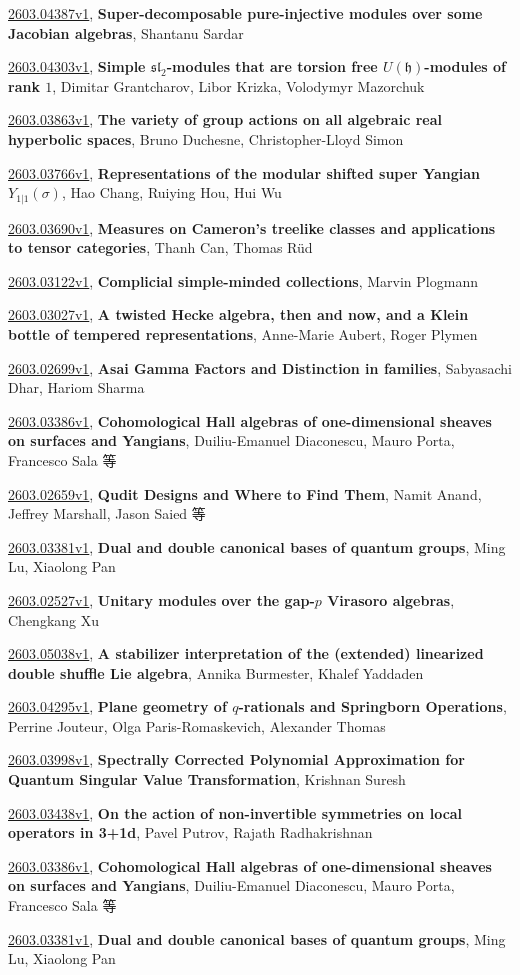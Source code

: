 \documentclass[9pt, a4paper]{article}
\theoremstyle{plain}
\theoremstyle{definition}
\theoremstyle{remark}
\newcommand{\arxiv}[3]{\href{https://arxiv.org/abs/#1}{#1}, \textbf{\textcolor{arxivblue}{#2}}, #3}
\begin{document}
\arxiv{2603.04387v1}{Super-decomposable pure-injective modules over some Jacobian algebras}{Shantanu Sardar}

\arxiv{2603.04303v1}{Simple $\mathfrak{sl}_2$-modules that are torsion free $U(\mathfrak{h})$-modules of rank $1$}{Dimitar Grantcharov, Libor Krizka, Volodymyr Mazorchuk}

\arxiv{2603.03863v1}{The variety of group actions on all algebraic real hyperbolic spaces}{Bruno Duchesne, Christopher-Lloyd Simon}

\arxiv{2603.03766v1}{Representations of the modular shifted super Yangian $Y_{1|1}(σ)$}{Hao Chang, Ruiying Hou, Hui Wu}

\arxiv{2603.03690v1}{Measures on Cameron's treelike classes and applications to tensor categories}{Thanh Can, Thomas Rüd}

\arxiv{2603.03122v1}{Complicial simple-minded collections}{Marvin Plogmann}

\arxiv{2603.03027v1}{A twisted Hecke algebra, then and now, and a Klein bottle of tempered representations}{Anne-Marie Aubert, Roger Plymen}

\arxiv{2603.02699v1}{Asai Gamma Factors and Distinction in families}{Sabyasachi Dhar, Hariom Sharma}

\arxiv{2603.03386v1}{Cohomological Hall algebras of one-dimensional sheaves on surfaces and Yangians}{Duiliu-Emanuel Diaconescu, Mauro Porta, Francesco Sala 等}

\arxiv{2603.02659v1}{Qudit Designs and Where to Find Them}{Namit Anand, Jeffrey Marshall, Jason Saied 等}

\arxiv{2603.03381v1}{Dual and double canonical bases of quantum groups}{Ming Lu, Xiaolong Pan}

\arxiv{2603.02527v1}{Unitary modules over the gap-$p$ Virasoro algebras}{Chengkang Xu}

\arxiv{2603.05038v1}{A stabilizer interpretation of the (extended) linearized double shuffle Lie algebra}{Annika Burmester, Khalef Yaddaden}

\arxiv{2603.04295v1}{Plane geometry of $q$-rationals and Springborn Operations}{Perrine Jouteur, Olga Paris-Romaskevich, Alexander Thomas}

\arxiv{2603.03998v1}{Spectrally Corrected Polynomial Approximation for Quantum Singular Value Transformation}{Krishnan Suresh}

\arxiv{2603.03438v1}{On the action of non-invertible symmetries on local operators in 3+1d}{Pavel Putrov, Rajath Radhakrishnan}

\arxiv{2603.03386v1}{Cohomological Hall algebras of one-dimensional sheaves on surfaces and Yangians}{Duiliu-Emanuel Diaconescu, Mauro Porta, Francesco Sala 等}

\arxiv{2603.03381v1}{Dual and double canonical bases of quantum groups}{Ming Lu, Xiaolong Pan}

\end{document}
